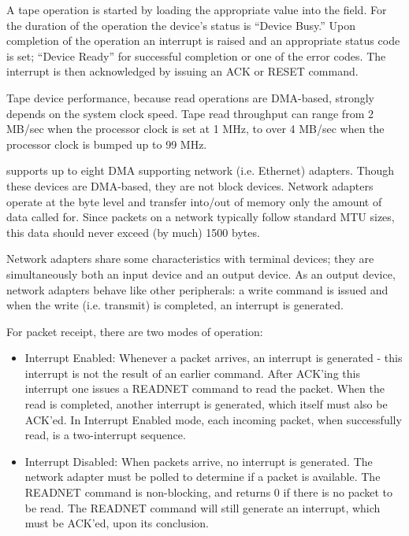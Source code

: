 A tape operation is started by loading the appropriate value into the  field. 
For the duration of the operation the device’s status is “Device Busy.” 
Upon completion of the operation an interrupt is raised and an appropriate status code is set; “Device Ready” for successful completion or one of the error codes. 
The interrupt is then acknowledged by issuing an ACK or RESET command.

Tape device performance, because read operations are DMA-based, strongly depends on the system clock speed. Tape read throughput can range from 2 MB/sec when the processor clock is set at 1 MHz, to over 4 MB/sec when the processor clock is bumped up to 99 MHz.



\uarm{} supports up to eight DMA supporting network (i.e. Ethernet) adapters. 
Though these devices are DMA-based, they are not block devices. 
Network adapters operate at the byte level and transfer into/out of memory only the amount of data called for. 
Since packets on a network typically follow standard MTU sizes, this data should never exceed (by much) 1500 bytes.

Network adapters share some characteristics with terminal devices; they are simultaneously both an input device and an output device. 
As an output device, network adapters behave like other peripherals: a write command is issued and when the write (i.e. transmit) is completed, an interrupt is generated.

For packet receipt, there are two modes of operation:

\begin{itemize}
	\item Interrupt Enabled: Whenever a packet arrives, an interrupt is generated - this interrupt is not the result of an earlier command. 
		After ACK’ing this interrupt one issues a READNET command to read the packet. 
		When the read is completed, another interrupt is generated, which itself must also be ACK’ed. 
		In Interrupt Enabled mode, each incoming packet, when successfully read, is a two-interrupt sequence.
	\item Interrupt Disabled: When packets arrive, no interrupt is generated. 
		The network adapter must be polled to determine if a packet is available. 
		The READNET command is non-blocking, and returns 0 if there is no packet to be read. 
		The READNET command will still generate an interrupt, which must be ACK’ed, upon its conclusion.
\end{itemize}

